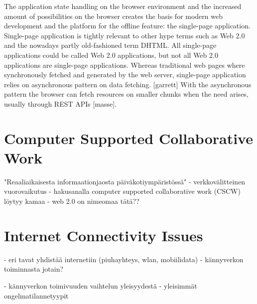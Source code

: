The application state handling on the browser environment and the increased amount of possibilities on the browser creates the basis for modern web development and the platform for the offline feature: the single-page application. Single-page application is tightly relevant to other hype terms such as Web 2.0 and the nowadays partly old-fashioned term DHTML. All single-page applications could be called Web 2.0 applications, but not all Web 2.0 applications are single-page applications. Whereas traditional web pages where synchronously fetched and generated by the web server, single-page application relies on asynchronous pattern on data fetching. [garrett] With the asynchronous pattern the browser can fetch resources on smaller chunks when the need arises, usually through REST APIs [masse].






\section{Computer Supported Collaborative Work}
"Reaaliaikaisesta informaationjaosta päiväkotiympäristössä"
- verkkovälitteinen vuorovaikutus
- hakusanalla computer supported collaborative work (CSCW) löytyy kamaa 
- web 2.0 on nimeomaa tätä??



\section{Internet Connectivity Issues}
 - eri tavat yhdistää internetiin (piuhayhteys, wlan, mobiilidata)
 - kännyverkon toiminnasta jotain?

 - kännyverkon toimivuuden vaihtelun yleisyydestä
 - yleisimmät ongelmatilannetyypit







